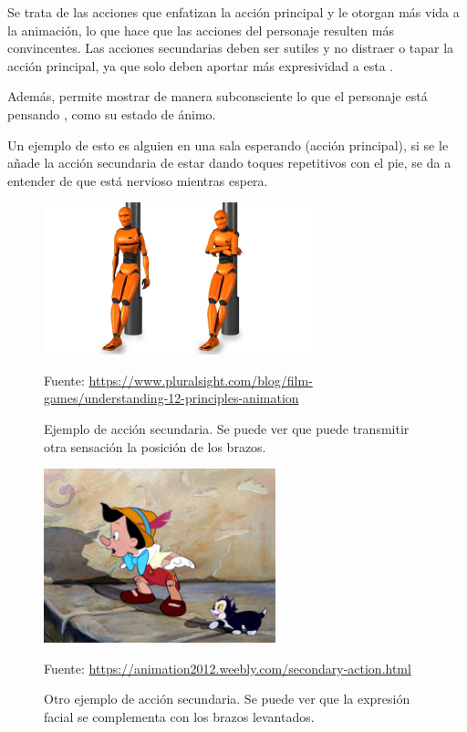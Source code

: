\documentclass{article}
\begin{document}
Se trata de las acciones que enfatizan la acción principal y le otorgan más vida a la animación, lo que hace que las acciones del personaje resulten más convincentes. Las acciones secundarias deben ser sutiles y no distraer o tapar la acción principal, ya que solo deben aportar más expresividad a esta \cite{plural}.

\bigskip

Además, permite mostrar de manera subconsciente lo que el personaje está pensando \cite{idearocket}, como su estado de ánimo.

\bigskip


Un ejemplo de esto es alguien en una sala esperando (acción principal), si se le añade la acción secundaria de estar dando toques repetitivos con el pie, se da a entender de que está nervioso mientras espera.

\begin{figure}[H]
    \centering
    \includegraphics[width=0.7\textwidth]{imagenes/secondary-action.png}
    \caption{Ejemplo de acción secundaria. Se puede ver que puede transmitir otra sensación la posición de los brazos.}
    \vspace{10pt}
    \footnotesize{Fuente: \url{https://www.pluralsight.com/blog/film-games/understanding-12-principles-animation}}
\end{figure}


\begin{figure}[H]
    \centering
    \includegraphics[width=0.6\textwidth]{imagenes/sec-ac.jpg}
    \caption{Otro ejemplo de acción secundaria. Se puede ver que la expresión facial se complementa con los brazos levantados.}
    \vspace{10pt}
    \footnotesize{Fuente: \url{https://animation2012.weebly.com/secondary-action.html}}
\end{figure}
\end{document}
